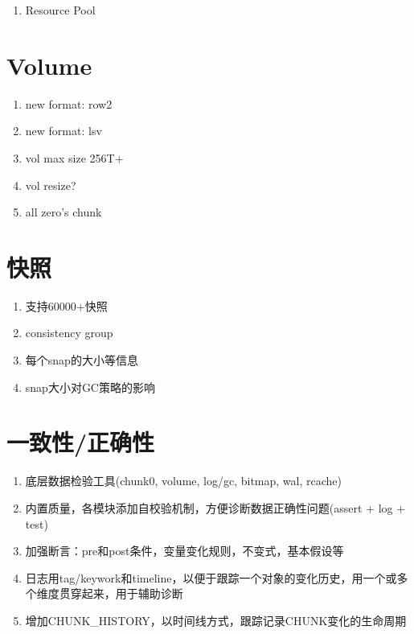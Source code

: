 \begin{enumerate}
    \item Resource Pool
\end{enumerate}

\section{Volume}

\begin{enumerate}
    \item new format: row2
    \item new format: lsv
    \item vol max size 256T+
    \item vol resize?
    \item all zero's chunk
\end{enumerate}

\section{快照}

\begin{enumerate}
    \item 支持60000+快照
    \item consistency group
    \item 每个snap的大小等信息
    \item snap大小对GC策略的影响
\end{enumerate}

\section{一致性/正确性}

\begin{tcolorbox}
\begin{enumerate}
    \item 底层数据检验工具(chunk0, volume, log/gc, bitmap, wal, rcache)
    \item 内置质量，各模块添加自校验机制，方便诊断数据正确性问题(assert + log + test)
    \item 加强断言：pre和post条件，变量变化规则，不变式，基本假设等
    \item 日志用tag/keywork和timeline，以便于跟踪一个对象的变化历史，用一个或多个维度贯穿起来，用于辅助诊断
    \item 增加CHUNK\_HISTORY，以时间线方式，跟踪记录CHUNK变化的生命周期
\end{enumerate}
\end{tcolorbox}

